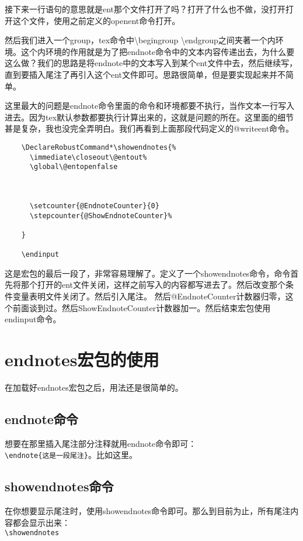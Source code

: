 \documentclass[11pt,oneside]{book}
\begin{document}
  接下来一行语句的意思就是ent那个文件打开了吗？打开了什么也不做，没打开打开这个文件，使用之前定义的openent命令打开。

  然后我们进入一个group，tex命令中\textbackslash begingroup \textbackslash endgroup之间夹著一个内环境。这个内环境的作用就是为了把endnote命令中的文本内容传递出去，为什么要这么做？我们的思路是将endnote中的文本写入到某个ent文件中去，然后继续写，直到要插入尾注了再引入这个ent文件即可。思路很简单，但是要实现起来并不简单。

  这里最大的问题是endnote命令里面的命令和环境都要不执行，当作文本一行写入进去。因为tex默认参数都要执行计算出来的，这就是问题的所在。这里面的细节甚是复杂，我也没完全弄明白。我们再看到上面那段代码定义的@writeent命令。


  \begin{Verbatim}
    \DeclareRobustCommand*\showendnotes{%
      \immediate\closeout\@entout%
      \global\@entopenfalse

      

      \setcounter{@EndnoteCounter}{0}
      \stepcounter{@ShowEndnoteCounter}%

    }

    \endinput
  \end{Verbatim}
  这是宏包的最后一段了，非常容易理解了。定义了一个showendnotes命令，命令首先将那个打开的ent文件关闭，这样之前写入的内容都写进去了。然后改变那个条件变量表明文件关闭了。然后引入尾注。
  然后@EndnoteCounter计数器归零，这个前面谈到过。然后ShowEndnoteCounter计数器加一。然后结束宏包使用endinput命令。


  \section{endnotes宏包的使用}
  在加载好endnotes宏包之后，用法还是很简单的。

  \subsection{endnote命令}
  想要在那里插入尾注部分注释就用endnote命令即可：\\
  \verb+\endnote{这是一段尾注}+。比如这里。

  \subsection{showendnotes命令}
  在你想要显示尾注时，使用showendnotes命令即可。那么到目前为止，所有尾注内容都会显示出来：\\
  \verb+\showendnotes+
\end{document}
